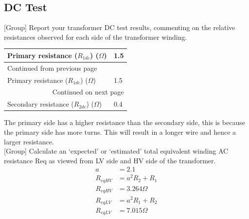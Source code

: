 \documentclass[11pt]{article}
\begin{document}
\subsection{DC Test}
\label{sec:org71add58}
{[}Group] Report your transformer DC test results, commenting on the relative resistances observed for each side of the transformer winding.
\begin{longtable}{|l|l|}
\hline
Primary resistance (\(R_{1dc}\)) (\(\Omega\)) & 1.5\\
\hline
\endfirsthead
\multicolumn{2}{l}{Continued from previous page} \\
\hline

Primary resistance (\(R_{1dc}\)) (\(\Omega\)) & 1.5 \\

\hline
\endhead
\hline\multicolumn{2}{r}{Continued on next page} \\
\endfoot
\endlastfoot
\hline
Secondary resistance (\(R_{2dc}\)) (\(\Omega\)) & 0.4\\
\hline
\end{longtable}
The primary side has a higher resistance than the secondary side, this is because the primary side has more turns. This will result in a longer wire and hence a larger resistance.\\
{[}Group] Calculate an ‘expected’ or ‘estimated’ total equivalent winding AC resistance Req as viewed from LV side and HV side of the transformer.
\begin{align*}
a&=2.1 \\
R_{eqHV}&=a^{2}R_2+R_1\\
R_{eqHV}&=3.264\Omega \\
R_{eqLV}&=a^{2}R_1+R_2\\
R_{eqLV}&=7.015\Omega \\
\end{align*}
\end{document}
